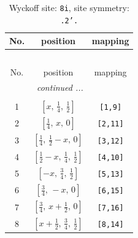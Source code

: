 \documentclass[fleqn,8pt]{jsarticle}
\begin{document}
\begin{longtable}{ccc}
\caption{Wyckoff site: {\tt 8i}, site symmetry: {\tt .2'.}}
 \\
 \hline \hline
No. & position & mapping \\ \hline \endfirsthead

\multicolumn{2}{l}{\tablename\ \thetable{}} \\
 \hline \hline
No. & position & mapping \\ \hline \endhead

 \hline \hline
\multicolumn{2}{r}{\footnotesize\it continued ...} \\ \endfoot

 \hline \hline
\multicolumn{2}{r}{} \\ \endlastfoot

1 & $\left[ x,\, \frac{1}{4},\, \frac{1}{2} \right]$ & {\tt [1,9]} \\ \hline
2 & $\left[ \frac{1}{4},\, x,\, 0 \right]$ & {\tt [2,11]} \\ \hline
3 & $\left[ \frac{1}{4},\, \frac{1}{2} - x,\, 0 \right]$ & {\tt [3,12]} \\ \hline
4 & $\left[ \frac{1}{2} - x,\, \frac{1}{4},\, \frac{1}{2} \right]$ & {\tt [4,10]} \\ \hline
5 & $\left[ - x,\, \frac{3}{4},\, \frac{1}{2} \right]$ & {\tt [5,13]} \\ \hline
6 & $\left[ \frac{3}{4},\, - x,\, 0 \right]$ & {\tt [6,15]} \\ \hline
7 & $\left[ \frac{3}{4},\, x + \frac{1}{2},\, 0 \right]$ & {\tt [7,16]} \\ \hline
8 & $\left[ x + \frac{1}{2},\, \frac{3}{4},\, \frac{1}{2} \right]$ & {\tt [8,14]} \\
\end{longtable}
\renewcommand{\arraystretch}{1.2}
\end{document}
